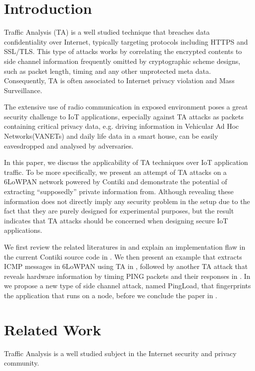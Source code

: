 \section{Introduction}
Traffic Analysis (TA) is a well studied technique that breaches data confidentiality over Internet, typically targeting protocols including HTTPS\cite{rfc2818} and SSL\cite{rfc6101}/TLS\cite{rfc5246}. This type of attacks works by correlating the encrypted contents to side channel information frequently omitted by cryptographic scheme designs, such as packet length, timing and any other unprotected meta data. Consequently, TA is often associated to Internet privacy violation and Mass Surveillance.

The extensive use of radio communication in exposed environment poses a great security challenge to IoT applications, especially against TA attacks as packets containing critical privacy data, e.g. driving information in Vehicular Ad Hoc Networks(VANETs)\cite{VANET} and daily life data in a smart house, can be easily eavesdropped and analysed by adversaries.

In this paper, we discuss the applicability of TA techniques over IoT application traffic. To be more specifically, we present an attempt of TA attacks on a 6LoWPAN\cite{rfc4944} network powered by Contiki\cite{Contiki} and demonstrate the potential of extracting ``supposedly'' private information from. Although revealing these information does not directly imply any security problem in the setup due to the fact that they are purely designed for experimental purposes, but the result indicates that TA attacks should be concerned when designing secure IoT applications.

We first review the related literatures in  and explain an implementation flaw in the current Contiki source code in . We then present an example that extracts ICMP messages in 6LoWPAN using TA in , followed by another TA attack that reveals hardware information by timing PING packets and their responses in . In  we propose a new type of side channel attack, named PingLoad, that fingerprints the application that runs on a node, before we conclude the paper in .

\section{Related Work \label{RelatedWork}}
Traffic Analysis is a well studied subject in the Internet security and privacy community.

